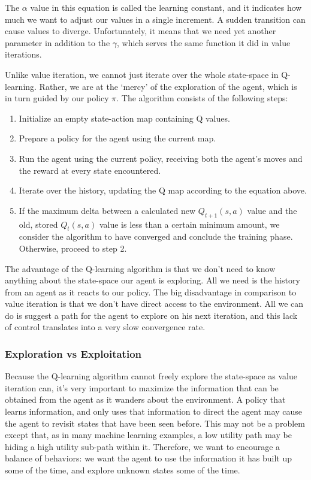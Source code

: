 \documentclass[12pt, letterpaper]{article}
\begin{document}
The $\alpha$ value in this equation is called the learning constant, and it indicates how much we want to adjust our values in a single increment. A sudden transition can cause values to diverge. Unfortunately, it means that we need yet another parameter in addition to the $\gamma$, which serves the same function it did in value iterations.

Unlike value iteration, we cannot just iterate over the whole state-space in Q-learning. Rather, we are at the `mercy' of the exploration of the agent, which is in turn guided by our policy $\pi$. The algorithm consists of the following steps:

\begin{enumerate}
\item Initialize an empty state-action map containing Q values.
\item Prepare a policy for the agent using the current map.
\item Run the agent using the current policy, receiving both the agent's moves and the reward at every state encountered.
\item Iterate over the history, updating the Q map according to the equation above. 
\item If the maximum delta between a calculated new $Q_{t+1}(s, a)$ value and the old, stored $Q_t(s, a)$ value is less than a certain minimum amount, we consider the algorithm to have converged and conclude the training phase. Otherwise, proceed to step 2.
\end{enumerate}

The advantage of the Q-learning algorithm is that we don't need to know anything about the state-space our agent is exploring. All we need is the history from an agent as it reacts to our policy. The big disadvantage in comparison to value iteration is that we don't have direct access to the environment. All we can do is suggest a path for the agent to explore on his next iteration, and this lack of control translates into a very slow convergence rate.

\subsubsection*{Exploration vs Exploitation}
Because the Q-learning algorithm cannot freely explore the state-space as value iteration can, it's very important to maximize the information that can be obtained from the agent as it wanders about the environment. A policy that learns information, and only uses that information to direct the agent may cause the agent to revisit states that have been seen before. This may not be a problem except that, as in many machine learning examples, a low utility path may be hiding a high utility sub-path within it. Therefore, we want to encourage a balance of behaviors: we want the agent to use the information it has built up some of the time, and explore unknown states some of the time.
\end{document}
